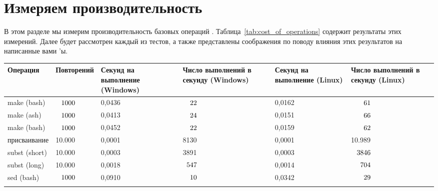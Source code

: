 \section{Измеряем производительность}

В этом разделе мы измерим производительность базовых операций
\GNUmake{}. Таблица~\ref{tab:cost_of_operations} содержит результаты
этих измерений. Далее будет рассмотрен каждый из тестов, а также
представлены соображения по поводу влияния этих результатов на
написанные вами \Makefile{}'ы.

\begin{table}[!b]
{\footnotesize
\begin{tabular}{llllll}
\hline
\vspace{0.3em}
Операция &
Повторений &
\parbox[b]{2cm}{\flushleft Секунд на \break выполнение (Windows)} &
\parbox[b]{2cm}{\flushleft Число \break выполнений в секунду (Windows)} &
\parbox[b]{2cm}{\flushleft Секунд на \break выполнение (Linux)} &
\parbox[b]{2cm}{\flushleft Число \break выполнений в секунду (Linux)} \\
\hline
\vspace{0.5em}
make (bash) & $\hphantom{0.}1000$ & 0,0436 & $\hphantom{00}22$ & 0,0162 & $\hphantom{000.}61$ \\
\vspace{0.5em}
make (ash) & $\hphantom{0.}1000$ & 0,0413 & $\hphantom{00}24$ & 0,0151 & $\hphantom{000.}66$ \\
\vspace{0.5em}
make (bash) & $\hphantom{0.}1000$ & 0,0452 & $\hphantom{00}22$ & 0,0159 & $\hphantom{000.}62$ \\
\vspace{0.5em}
присваивание & 10.000 & 0,0001 & 8130 & 0,0001 & 10.989 \\
\vspace{0.5em}
subst (short) & 10.000 & 0,0003 & 3891 & 0,0003 & $\hphantom{0.}3846$ \\
\vspace{0.5em}
subst (long) & 10.000 & 0,0018 & $\hphantom{0}547$ & 0,0014 & $\hphantom{00.}704$ \\
\vspace{0.5em}
sed (bash) & $\hphantom{0.}1000$ & 0,0910 & $\hphantom{00}10$ & 0,0342 & $\hphantom{000.}29$ \\
\vspace{0.5em}

\end{tabular}}
\end{table}
